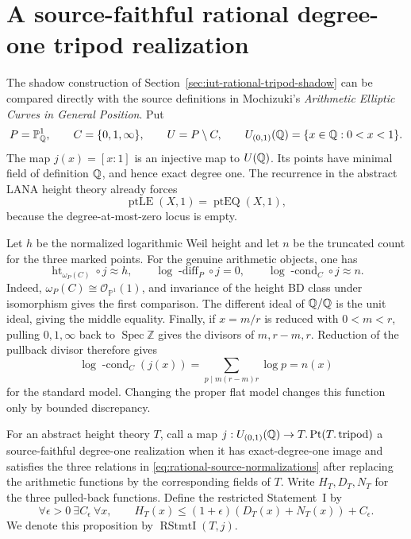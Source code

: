 \section{A source-faithful rational degree-one tripod realization}
\label{sec:iut-rational-degree-one-source-realization}

The shadow construction of
Section~\ref{sec:iut-rational-tripod-shadow} can be compared directly with the
source definitions in Mochizuki's \emph{Arithmetic Elliptic Curves in General
Position}.  Put
\[
 P=\mathbb P^1_{\mathbb Q},\qquad C=\{0,1,\infty\},\qquad U=P\setminus C,
 \qquad U_{(0,1)}(\mathbb Q)=\{x\in\mathbb Q:0<x<1\}.
\]
The map $j(x)=[x:1]$ is an injective map to $U(\mathbb Q)$.  Its points have minimal
field of definition $\mathbb Q$, and hence exact degree one.  The recurrence in the
abstract LANA height theory already forces
\begin{equation}\label{eq:ptle-one-equals-pteq-one}
                    \operatorname{ptLE}(X,1)=\operatorname{ptEQ}(X,1),
\end{equation}
because the degree-at-most-zero locus is empty.

Let $h$ be the normalized logarithmic Weil height and let $n$ be the truncated
count for the three marked points.  For the genuine arithmetic objects, one
has
\begin{equation}\label{eq:rational-source-normalizations}
 \operatorname{ht}_{\omega_P(C)}\circ j\approx h,
 \qquad \log\operatorname{-diff}_P\circ j=0,
 \qquad \log\operatorname{-cond}_C\circ j\approx n.
\end{equation}
Indeed, $\omega_P(C)\cong\mathcal O_{\mathbb P^1}(1)$, and invariance of the
height BD class under isomorphism gives the first comparison.  The different
ideal of $\mathbb Q/\mathbb Q$ is the unit ideal, giving the middle equality.  Finally, if
$x=m/r$ is reduced with $0<m<r$, pulling $0,1,\infty$ back to
$\operatorname{Spec}\mathbb Z$ gives the divisors of $m,r-m,r$.  Reduction of
the pullback divisor therefore gives
\[
 \log\operatorname{-cond}_C(j(x))
   =\sum_{p\mid m(r-m)r}\log p=n(x)
\]
for the standard model.  Changing the proper flat model changes this function
only by bounded discrepancy.

For an abstract height theory $T$, call a map
$j:U_{(0,1)}(\mathbb Q)\to T.\operatorname{Pt}(T.\operatorname{tripod})$ a
source-faithful degree-one realization when it has exact-degree-one image and
satisfies the three relations in \eqref{eq:rational-source-normalizations}
after replacing the arithmetic functions by the corresponding fields of $T$.
Write $H_T,D_T,N_T$ for the three pulled-back functions.  Define the restricted
Statement~I by
\begin{equation}\label{eq:rational-source-restricted-statement-i}
 \forall\epsilon>0\ \exists C_\epsilon\ \forall x,\qquad
 H_T(x)\le(1+\epsilon)(D_T(x)+N_T(x))+C_\epsilon.
\end{equation}
We denote this proposition by $\operatorname{RStmtI}(T,j)$.

